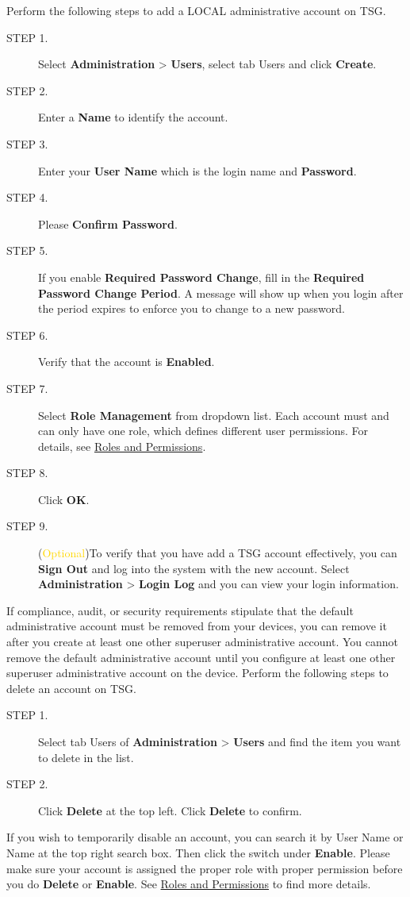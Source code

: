 Perform the following steps to add a LOCAL administrative account on TSG.\\
\begin{description}
    \item[STEP 1.] Select \textbf{Administration} > \textbf{Users}, select tab Users and click \textbf{Create}.
    \item[STEP 2.] Enter a \textbf{Name} to identify the account.
    \item[STEP 3.] Enter your \textbf{User Name} which is the login name and \textbf{Password}. 
    \item[STEP 4.] Please \textbf{Confirm Password}.
    \item[STEP 5.] If you enable \textbf{Required Password Change}, fill in the \textbf{Required Password Change Period}. 
    A message will show up when you login after the period expires to enforce you to change to a new password.
    \item[STEP 6.] Verify that the account is \textbf{Enabled}.
    \item[STEP 7.] Select \textbf{Role Management} from dropdown list. Each account must and can only have one role, which defines different user permissions. 
    For details, see \hyperlink{link:Roles and Permissions}{\textcolor{linkblue}{Roles and Permissions}}.
    \item[STEP 8.] Click \textbf{OK}.
    \item[STEP 9.] (\textcolor{gold}{Optional})To verify that you have add a TSG account effectively, you can \textbf{Sign Out} and log into the system with the new account. 
    Select \textbf{Administration} > \textbf{Login Log} and you can view your login information.
\end{description}
If compliance, audit, or security requirements stipulate that the default administrative account must be removed from your devices, 
you can remove it after you create at least one other superuser administrative account. 
You cannot remove the default administrative account until you configure at least one other superuser administrative account on the device. 
Perform the following steps to delete an account on TSG.\\
\begin{description}
    \item[STEP 1.] Select tab Users of \textbf{Administration} > \textbf{Users} and find the item you want to delete in the list.
    \item[STEP 2.] Click \textbf{Delete} at the top left. Click \textbf{Delete} to confirm.
\end{description}
If you wish to temporarily disable an account, you can search it by User Name or Name at the top right search box. 
Then click the switch under \textbf{Enable}. Please make sure your account is assigned the proper role with proper permission before you do \textbf{Delete} or \textbf{Enable}. 
See \hyperlink{link:Roles and Permissions}{\textcolor{linkblue}{Roles and Permissions}} to find more details.


